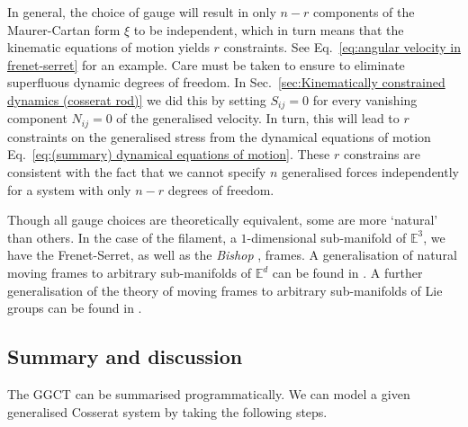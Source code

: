 In general, the choice of gauge will result in only $n-r$ components of the Maurer-Cartan form $\xi$ to be independent, which in turn means that the kinematic equations of motion yields $r$ constraints. See Eq.~\ref{eq:angular velocity in frenet-serret} for an example. Care must be taken to ensure to eliminate superfluous dynamic degrees of freedom. In Sec.~\ref{sec:Kinematically constrained dynamics (cosserat rod)} we did this by setting $S_{ij} = 0$ for every vanishing component $N_{ij}=0$ of the generalised velocity. In turn, this will lead to $r$ constraints on the generalised stress from the dynamical equations of motion Eq.~\ref{eq:(summary) dynamical equations of motion}. These $r$ constrains are consistent with the fact that we cannot specify $n$ generalised forces independently for a system with only $n-r$ degrees of freedom.

Though all gauge choices are theoretically equivalent, some are more `natural' than others. In the case of the filament, a $1$-dimensional sub-manifold of $\mathbb{E}^3$, we have the Frenet-Serret, as well as the \textit{Bishop} \citep{bishopThereMoreOne1975, carrollImprovingFrenetFrame2013}, frames. A generalisation of natural moving frames to arbitrary sub-manifolds of $\mathbb{E}^d$ can be found in \citep{cartanGeometryRiemannianSpaces1983, cartanTheorieGroupesFinis1938, levyReviewElieCartan1935}. A further generalisation of the theory of moving frames to arbitrary sub-manifolds of Lie groups can be found in \citep{olverSurveyMovingFrames2005, felsMovingCoframesPractical1998, felsMovingCoframesII1999, olverModernDevelopmentsTheory}.



\subsection{Summary and discussion} \label{sec:geometrisation discussion}

The GGCT can be summarised programmatically. We can model a given generalised Cosserat system by taking the following steps.

